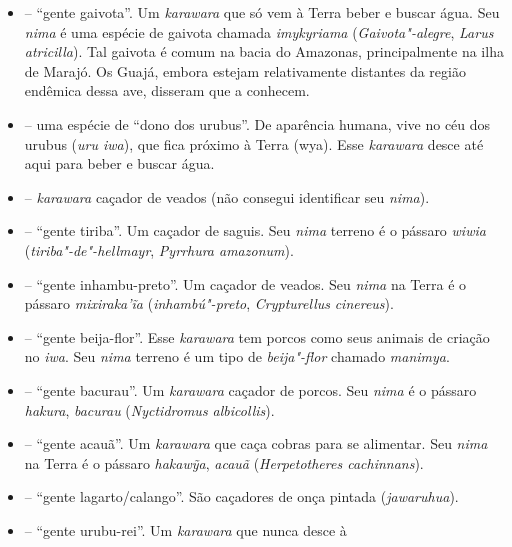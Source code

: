 \begin{itemize}
   -- ``gente maçariquinho''. Um caçador de antas. Seu \emph{nima} na
  Terra é uma espécie de maçarico chamado \emph{akyry,}
  Batuíra"-de"-coleira (\emph{Charadrius collaris}).
\item
  \emph{} -- ``gente gaivota''. Um \emph{karawara} que só vem à
  Terra beber e buscar água. Seu \emph{nima} é uma espécie de gaivota
  chamada \emph{imykyriama} (\emph{Gaivota"-alegre}, \emph{Larus}
  \emph{atricilla}). Tal gaivota é comum na bacia do Amazonas,
  principalmente na ilha de Marajó. Os Guajá, embora estejam
  relativamente distantes da região endêmica dessa ave, disseram que a
  conhecem.
\item
  \emph{} -- uma espécie de ``dono dos urubus''. De
  aparência humana, vive no céu dos urubus (\emph{uru iwa}), que fica
  próximo à Terra (wya). Esse \emph{karawara} desce até aqui para beber
  e buscar água.
\item
  \emph{} -- \emph{karawara} caçador de veados (não
  consegui identificar seu \emph{nima}).
\item
  \emph{} -- ``gente tiriba''. Um caçador de saguis. Seu \emph{nima}
  terreno é o pássaro \emph{wiwia} (\emph{tiriba"-de"-hellmayr},
  \emph{Pyrrhura amazonum}).
\item
  \emph{} -- ``gente inhambu-preto''. Um caçador de veados. Seu \emph{nima} na
  Terra é o pássaro \emph{mixiraka'ĩa} (\emph{inhambú"-preto},
  \emph{Crypturellus} \emph{cinereus}).
\item
  \emph{} -- ``gente beija-flor''. Esse \emph{karawara} tem porcos como
  seus animais de criação no \emph{iwa}. Seu \emph{nima} terreno é um
  tipo de \emph{beija"-flor} chamado \emph{manimya}.
\item
  \emph{} -- ``gente bacurau''. Um \emph{karawara} caçador de porcos. Seu
  \emph{nima} é o pássaro \emph{hakura}, \emph{bacurau}
  (\emph{Nyctidromus albicollis}).
\item
  \emph{} -- ``gente acauã''. Um \emph{karawara} que caça cobras para
  se alimentar. Seu \emph{nima} na Terra é o pássaro \emph{hakawỹa},
  \emph{acauã} (\emph{Herpetotheres cachinnans}).
\item
  \emph{} -- ``gente lagarto/calango''. São caçadores
  de onça pintada (\emph{jawaruhua}).
\item
  \emph{} -- ``gente urubu-rei''. Um \emph{karawara} que nunca desce à

\end{itemize}
